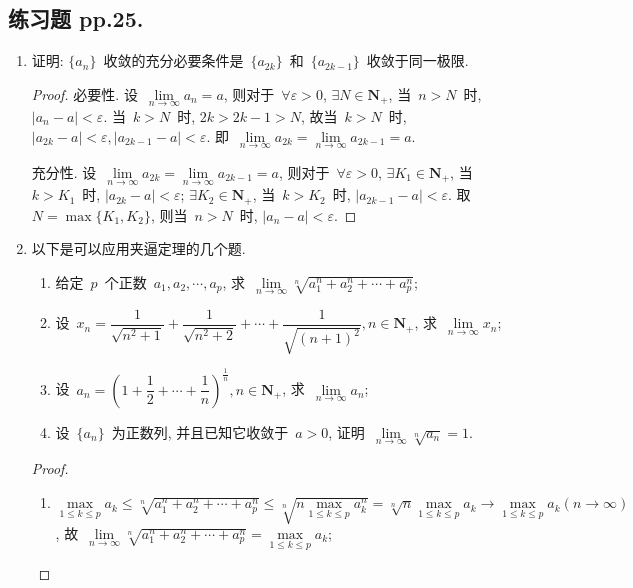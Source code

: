 \documentclass[UTF8,a4paper,11pt,twoside]{book}
\begin{document}
\subsection{练习题 pp.25.}
\begin{enumerate}
	\item	证明: $\{a_n\}$~收敛的充分必要条件是~$\{a_{2k}\}$~和~$\{a_{2k-1}\}$~收敛于同一极限.
	      \begin{proof}
		      必要性. 设~$\lim\limits_{n\to\infty} a_n=a$, 则对于~$\forall\varepsilon>0$, $\exists N\in\mathbf{N}_{+}$, 当~$n>N$~时, $|a_n-a|<\varepsilon$. 当~$k>N$~时, $2k>2k-1>N$, 故当~$k>N$~时, $|a_{2k}-a|<\varepsilon, |a_{2k-1}-a|<\varepsilon$. 即~$\lim\limits_{n\to\infty} a_{2k}=\lim\limits_{n\to\infty} a_{2k-1}=a$.

		      充分性. 设~$\lim\limits_{n\to\infty} a_{2k}=\lim\limits_{n\to\infty} a_{2k-1}=a$, 则对于~$\forall\varepsilon>0$, $\exists K_1\in\mathbf{N}_{+}$, 当~$k>K_1$~时, $|a_{2k}-a|<\varepsilon$; $\exists K_2\in\mathbf{N}_{+}$, 当~$k>K_2$~时, $|a_{2k-1}-a|<\varepsilon$. 取~$N=\max\{K_1,K_2\}$, 则当~$n>N$~时, $|a_n-a|<\varepsilon$.\qedhere
	      \end{proof}
	\item 以下是可以应用夹逼定理的几个题.
	      \begin{enumerate}[(1)]
		      \item 给定~$p$~个正数~$a_1,a_2,\cdots,a_p$, 求~$\lim\limits_{n\to\infty} \sqrt[n]{a_1^n+a_2^n+\cdots+a_p^n}$;
		      \item 设~$x_n=\dfrac{1}{\sqrt{n^2+1}}+\dfrac{1}{\sqrt{n^2+2}}+\cdots+\dfrac{1}{\sqrt{(n+1)^2}}, n\in\mathbf{N}_{+}$, 求~$\lim\limits_{n\to\infty} x_n$;
		      \item 设~$a_n=\left(1+\dfrac{1}{2}+\cdots+\dfrac{1}{n}\right)^\frac{1}{n}, n\in\mathbf{N}_{+}$, 求~$\lim\limits_{n\to\infty} a_n$;
		      \item 设~$\{a_n\}$~为正数列, 并且已知它收敛于~$a>0$, 证明~$\lim\limits_{n\to\infty} \sqrt[n]{a_n}=1$.
	      \end{enumerate}
	      \begin{proof}
		      \begin{enumerate}[(1)]
			      \item $\max\limits_{1\leqslant k\leqslant p} a_k\leqslant\sqrt[n]{a_1^n+a_2^n+\cdots+a_p^n}\leqslant\sqrt[n]{n\max\limits_{1\leqslant k\leqslant p} a_k^n}=\sqrt[n]{n}\max\limits_{1\leqslant k\leqslant p} a_k\to\max\limits_{1\leqslant k\leqslant p} a_k (n\to\infty)$, 故~$\lim\limits_{n\to\infty} \sqrt[n]{a_1^n+a_2^n+\cdots+a_p^n}=\max\limits_{1\leqslant k\leqslant p} a_k$;

\end{enumerate}
\end{proof}
\end{enumerate}
\end{document}

